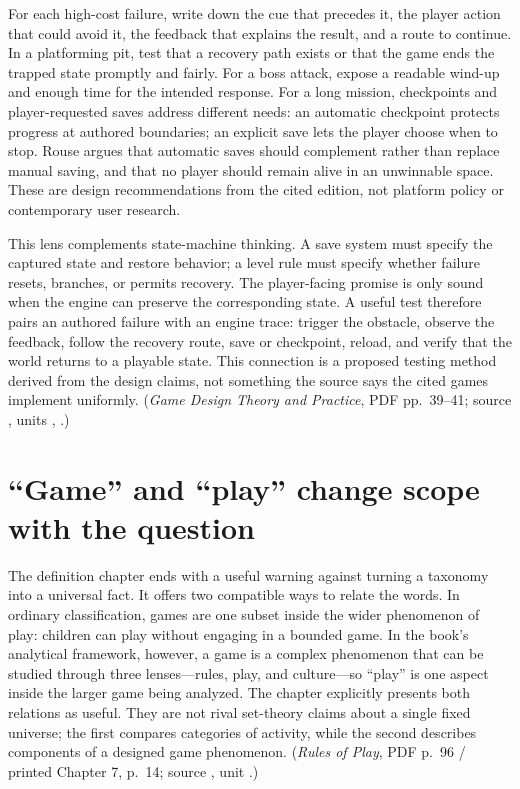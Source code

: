 For each high-cost failure, write down the cue that precedes it, the player action that could avoid it, the feedback that explains the result, and a route to continue. In a platforming pit, test that a recovery path exists or that the game ends the trapped state promptly and fairly. For a boss attack, expose a readable wind-up and enough time for the intended response. For a long mission, checkpoints and player-requested saves address different needs: an automatic checkpoint protects progress at authored boundaries; an explicit save lets the player choose when to stop. Rouse argues that automatic saves should complement rather than replace manual saving, and that no player should remain alive in an unwinnable space. These are design recommendations from the cited edition, not platform policy or contemporary user research.

This lens complements state-machine thinking. A save system must specify the captured state and restore behavior; a level rule must specify whether failure resets, branches, or permits recovery. The player-facing promise is only sound when the engine can preserve the corresponding state. A useful test therefore pairs an authored failure with an engine trace: trigger the obstacle, observe the feedback, follow the recovery route, save or checkpoint, reload, and verify that the world returns to a playable state. This connection is a proposed testing method derived from the design claims, not something the source says the cited games implement uniformly. (\emph{Game Design Theory and Practice}, PDF pp.~39--41; source , units , .)

\section{``Game'' and ``play'' change scope with the question}\label{06-engine-ii-ch047-game-and-play-change-scope-with-the-question}

\hypertarget{06-engine-ii-ch047-game-and-play-change-scope-with-the-question}{}

The definition chapter ends with a useful warning against turning a taxonomy into a universal fact. It offers two compatible ways to relate the words. In ordinary classification, games are one subset inside the wider phenomenon of play: children can play without engaging in a bounded game. In the book's analytical framework, however, a game is a complex phenomenon that can be studied through three lenses---rules, play, and culture---so ``play'' is one aspect inside the larger game being analyzed. The chapter explicitly presents both relations as useful. They are not rival set-theory claims about a single fixed universe; the first compares categories of activity, while the second describes components of a designed game phenomenon. (\emph{Rules of Play}, PDF p.~96 / printed Chapter 7, p.~14; source , unit .)

